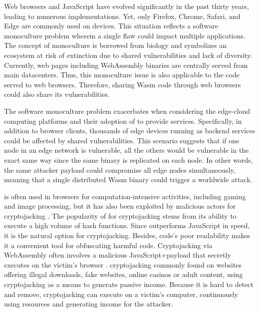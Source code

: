 
Web browsers and JavaScript have evolved significantly in the past thirty years, leading to numerous implementations. 
Yet, only Firefox, Chrome, Safari, and Edge are commonly used on devices.
This situation reflects a software monoculture problem wherein a single flaw could impact multiple applications. 
The concept of monoculture is borrowed from biology and symbolizes an ecosystem at risk of extinction due to shared vulnerabilities and lack of diversity. 
Currently, web pages including WebAssembly binaries are centrally served from main datacenters. 
Thus, this monoculture issue is also applicable to the \Wasm code served to web browsers. 
Therefore, sharing Wasm code through web browsers could also share its vulnerabilities. 

The software monoculture problem exacerbates when considering the edge-cloud computing platforms and their adoption of \Wasm to provide services.
Specifically, in addition to browser clients, thousands of edge devices running \Wasm as backend services could be affected by shared vulnerabilities. 
This scenario suggests that if one node in an edge network is vulnerable, all the others would be vulnerable in the exact same way since the same binary is replicated on each node. 
In other words, the same attacker payload could compromise all edge nodes simultaneously, meaning that a single distributed Wasm binary could trigger a worldwide attack.



\Wasm is often used in browsers for computation-intensive activities, including gaming and image processing, but it has also been exploited by malicious actors for cryptojacking \cite{10.1145/3339252.3339261}.
The popularity of \Wasm for cryptojacking stems from its ability to execute a high volume of hash functions. 
Since \Wasm outperforms JavaScript in speed, it is the natural option for cryptojacking.
Besides, \Wasm code's poor readability makes it a convenient tool for obfuscating harmful code.
Cryptojacking via WebAssembly often involves a malicious JavaScript+\Wasm payload that secretly executes on the victim's browser \cite{9566204}.
cryptojacking commonly found on websites offering illegal downloads, fake websites, online casinos or adult content, using cryptojacking as a means to generate passive income.
Because it is hard to detect and remove, cryptojacking can execute on a victim's computer, continuously using resources and generating income for the attacker.


